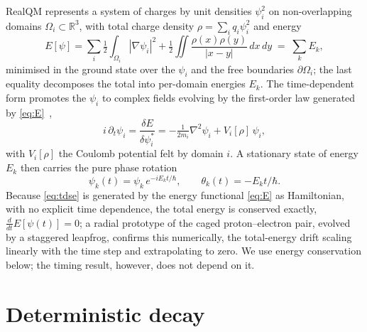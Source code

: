 \documentclass[11pt]{article}
\begin{document}
RealQM represents a system of charges by unit densities $\psi_i^2$ on non-overlapping domains
$\Omega_i\subset\mathbb R^3$, with total charge density $\rho=\sum_i q_i\psi_i^2$ and energy
\begin{equation}
E[\psi]=\sum_i\tfrac12\!\int_{\Omega_i}|\nabla\psi_i|^2+\tfrac12\!\iint\frac{\rho(x)\rho(y)}{|x-y|}\,dx\,dy
\;=\;\sum_k E_k ,
\label{eq:E}
\end{equation}
minimised in the ground state over the $\psi_i$ and the free boundaries $\partial\Omega_i$; the last
equality decomposes the total into per-domain energies $E_k$. The time-dependent form promotes the $\psi_i$
to complex fields evolving by the first-order law generated by \eqref{eq:E}~\cite{ComplexRealQM},
\begin{equation}
i\,\partial_t\psi_i=\frac{\delta E}{\delta \psi_i^*}=-\tfrac{1}{2m_i}\nabla^2\psi_i+V_i[\rho]\,\psi_i ,
\label{eq:tdse}
\end{equation}
with $V_i[\rho]$ the Coulomb potential felt by domain $i$. A stationary state of energy $E_k$ then carries
the pure phase rotation
\begin{equation}
\psi_k(t)=\psi_k\,e^{-iE_k t/\hbar},\qquad \theta_k(t)=-E_k t/\hbar .
\label{eq:phase}
\end{equation}
Because \eqref{eq:tdse} is generated by the energy functional \eqref{eq:E} as Hamiltonian, with no explicit
time dependence, the total energy is conserved exactly, $\tfrac{d}{dt}E[\psi(t)]=0$; a radial prototype of
the caged proton--electron pair, evolved by a staggered leapfrog, confirms this numerically, the
total-energy drift scaling linearly with the time step and extrapolating to zero. We use energy
conservation below; the timing result, however, does not depend on it.

\section{Deterministic decay}
\label{sec:half}
\end{document}
